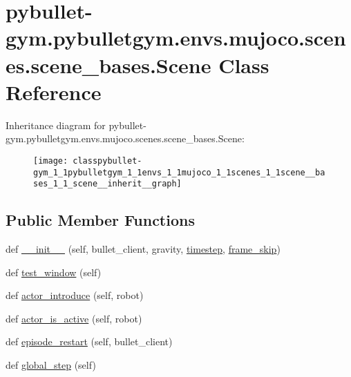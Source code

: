 \hypertarget{classpybullet-gym_1_1pybulletgym_1_1envs_1_1mujoco_1_1scenes_1_1scene__bases_1_1_scene}{}\section{pybullet-\/gym.pybulletgym.\+envs.\+mujoco.\+scenes.\+scene\+\_\+bases.\+Scene Class Reference}
\label{classpybullet-gym_1_1pybulletgym_1_1envs_1_1mujoco_1_1scenes_1_1scene__bases_1_1_scene}


Inheritance diagram for pybullet-\/gym.pybulletgym.\+envs.\+mujoco.\+scenes.\+scene\+\_\+bases.\+Scene\+:
\nopagebreak
\begin{figure}[H]
\begin{center}
\leavevmode
\texttt{[image: classpybullet-gym\_1\_1pybulletgym\_1\_1envs\_1\_1mujoco\_1\_1scenes\_1\_1scene\_\_bases\_1\_1\_scene\_\_inherit\_\_graph]}
\end{center}
\end{figure}
\subsection*{Public Member Functions}
\begin{DoxyCompactItemize}
\item 
def \hyperlink{classpybullet-gym_1_1pybulletgym_1_1envs_1_1mujoco_1_1scenes_1_1scene__bases_1_1_scene_a6b06e33053f3d81d46204bff9b36bb46}{\+\_\+\+\_\+init\+\_\+\+\_\+} (self, bullet\+\_\+client, gravity, \hyperlink{classpybullet-gym_1_1pybulletgym_1_1envs_1_1mujoco_1_1scenes_1_1scene__bases_1_1_scene_a29de076e83c72d0aafa872cd87253525}{timestep}, \hyperlink{classpybullet-gym_1_1pybulletgym_1_1envs_1_1mujoco_1_1scenes_1_1scene__bases_1_1_scene_ab01bd569d377a9da9fa4232dc63ddadf}{frame\+\_\+skip})
\item 
def \hyperlink{classpybullet-gym_1_1pybulletgym_1_1envs_1_1mujoco_1_1scenes_1_1scene__bases_1_1_scene_afc6b1d65fe06bc8b4c6ef4af2b34fdea}{test\+\_\+window} (self)
\item 
def \hyperlink{classpybullet-gym_1_1pybulletgym_1_1envs_1_1mujoco_1_1scenes_1_1scene__bases_1_1_scene_a9cc15dded5bc668ae8c3fa6ad9766269}{actor\+\_\+introduce} (self, robot)
\item 
def \hyperlink{classpybullet-gym_1_1pybulletgym_1_1envs_1_1mujoco_1_1scenes_1_1scene__bases_1_1_scene_a21e51bf62c432bb247457d1dc76c7da5}{actor\+\_\+is\+\_\+active} (self, robot)
\item 
def \hyperlink{classpybullet-gym_1_1pybulletgym_1_1envs_1_1mujoco_1_1scenes_1_1scene__bases_1_1_scene_a60c2296510552295c64aa7b6fd19158e}{episode\+\_\+restart} (self, bullet\+\_\+client)
\item 
def \hyperlink{classpybullet-gym_1_1pybulletgym_1_1envs_1_1mujoco_1_1scenes_1_1scene__bases_1_1_scene_a69cbabefe6228d917a5cdd866cc63400}{global\+\_\+step} (self)
\end{DoxyCompactItemize}
